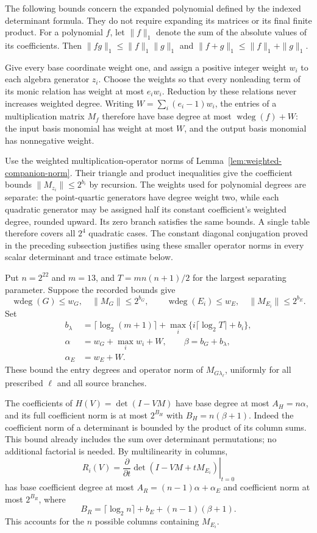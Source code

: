 \documentclass[11pt,a4paper]{article}
\theoremstyle{definition}
\theoremstyle{remark}
\begin{document}
The following bounds concern the expanded polynomial defined by the
indexed determinant formula. They do not require expanding its matrices
or its final finite product. For a polynomial $f$, let $\|f\|_1$ denote
the sum of the absolute values of its coefficients. Then
$\|fg\|_1\le\|f\|_1\|g\|_1$ and
$\|f+g\|_1\le\|f\|_1+\|g\|_1$.

Give every base coordinate weight one, and assign a positive integer
weight $w_i$ to each algebra generator $z_i$. Choose the weights so that
every nonleading term of its monic relation has weight at most
$e_iw_i$. Reduction by these relations never increases weighted degree.
Writing $W=\sum_i(e_i-1)w_i$, the entries of a multiplication matrix
$M_f$ therefore have base degree at most $\operatorname{wdeg}(f)+W$:
the input basis monomial has weight at most $W$, and the output basis
monomial has nonnegative weight.

Use the weighted multiplication-operator norms of
Lemma~\ref{lem:weighted-companion-norm}. Their triangle and product
inequalities give the coefficient bounds $\|M_{z_i}\|\le2^{b_i}$
by recursion. The weights used for polynomial degrees are separate:
the point-quartic generators have degree weight two, while each
quadratic generator may be assigned half its constant coefficient's
weighted degree, rounded upward. Its zero branch satisfies the same
bounds. A single table therefore covers all $2^4$ quadratic cases.
The constant diagonal conjugation proved in the preceding subsection
justifies using these smaller operator norms in every scalar
determinant and trace estimate below.

Put $n=2^{22}$ and $m=13$, and
$T=m n(n+1)/2$ for the largest separating parameter. Suppose the
recorded bounds give
\[
 \operatorname{wdeg}(G)\le w_G,\quad \|M_G\|\le2^{b_G},\qquad
 \operatorname{wdeg}(E_i)\le w_E,\quad \|M_{E_i}\|\le2^{b_E}.
\]
Set
\begin{align*}
 b_\lambda&=\lceil\log_2(m+1)\rceil
       +\max_i\{i\lceil\log_2 T\rceil+b_i\},\\
 \alpha&=w_G+\max_i w_i+W,\qquad \beta=b_G+b_\lambda,\\
 \alpha_E&=w_E+W.
\end{align*}
These bound the entry degrees and operator norm of
$M_{G\lambda_\ell}$, uniformly for all prescribed $\ell$ and all
source branches.

The coefficients of $H(V)=\det(I-VM)$ have base degree at most
$A_H=n\alpha$, and its full coefficient norm is at most
$2^{B_H}$ with $B_H=n(\beta+1)$. Indeed the coefficient norm of a
determinant is bounded by the product of its column sums. This bound
already includes the sum over determinant permutations; no additional
factorial is needed. By multilinearity in columns,
\[
 R_i(V)=\left.\frac{\partial}{\partial t}
       \det(I-VM+tM_{E_i})\right|_{t=0}
\]
has base coefficient degree at most
$A_R=(n-1)\alpha+\alpha_E$ and coefficient norm at most $2^{B_R}$,
where
\[
 B_R=\lceil\log_2 n\rceil+b_E+(n-1)(\beta+1).
\]
This accounts for the $n$ possible columns containing $M_{E_i}$.
\end{document}
